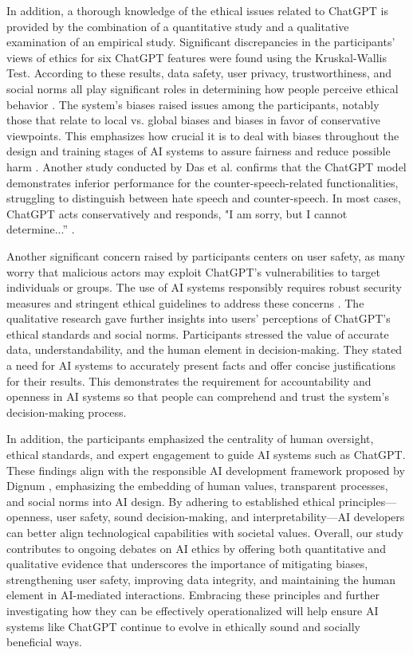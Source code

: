 \documentclass[sigconf]{acmart}
\begin{document}
In addition, a thorough knowledge of the ethical issues related to ChatGPT is provided by the combination of a quantitative study and a qualitative examination of an empirical study. Significant discrepancies in the participants' views of ethics for six ChatGPT features were found using the Kruskal-Wallis Test. According to these results, data safety, user privacy, trustworthiness, and social norms all play significant roles in determining how people perceive ethical behavior \cite{Leslie2019Understanding}. The system's biases raised issues among the participants, notably those that relate to local vs. global biases and biases in favor of conservative viewpoints. This emphasizes how crucial it is to deal with biases throughout the design and training stages of AI systems to assure fairness and reduce possible harm \cite{Varona2022Discrimination}. Another study conducted by Das et al. confirms that the ChatGPT model demonstrates inferior performance for the counter-speech-related functionalities, struggling to distinguish between hate speech and counter-speech. In most cases, ChatGPT acts conservatively and responds, "I am sorry, but I cannot determine...” \cite{das2023evaluating}.


Another significant concern raised by participants centers on user safety, as many worry that malicious actors may exploit ChatGPT’s vulnerabilities to target individuals or groups. The use of AI systems responsibly requires robust security measures and stringent ethical guidelines to address these concerns \cite{Ryan2020Artificial}. The qualitative research gave further insights into users' perceptions of ChatGPT's ethical standards and social norms. Participants stressed the value of accurate data, understandability, and the human element in decision-making. They stated a need for AI systems to accurately present facts and offer concise justifications for their results. This demonstrates the requirement for accountability and openness in AI systems so that people can comprehend and trust the system's decision-making process.

In addition, the participants emphasized the centrality of human oversight, ethical standards, and expert engagement to guide AI systems such as ChatGPT. These findings align with the responsible AI development framework proposed by Dignum \cite{Dignum2017Responsible}, emphasizing the embedding of human values, transparent processes, and social norms into AI design. By adhering to established ethical principles—openness, user safety, sound decision-making, and interpretability—AI developers can better align technological capabilities with societal values. Overall, our study contributes to ongoing debates on AI ethics by offering both quantitative and qualitative evidence that underscores the importance of mitigating biases, strengthening user safety, improving data integrity, and maintaining the human element in AI-mediated interactions. Embracing these principles and further investigating how they can be effectively operationalized will help ensure AI systems like ChatGPT continue to evolve in ethically sound and socially beneficial ways.
\end{document}
